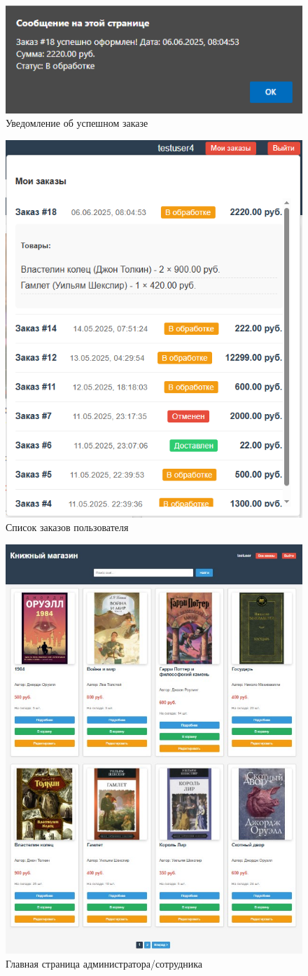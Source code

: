 \begin{figure}[H]
	\centering
	\includegraphics[width=0.7\linewidth]{images/заказсделан}
	\caption{Уведомление об успешном заказе}
	\label{fig:}
\end{figure}

\begin{figure}[H]
	\centering
	\includegraphics[width=0.5\linewidth]{images/222}
	\caption{Список заказов пользователя}
	\label{fig:222}
\end{figure}

\begin{figure}[H]
	\centering
	\includegraphics[width=0.5\linewidth]{images/Главная_страница_администратора}
	\caption{Главная страница администратора/сотрудника}
	\label{fig:22}
\end{figure}

